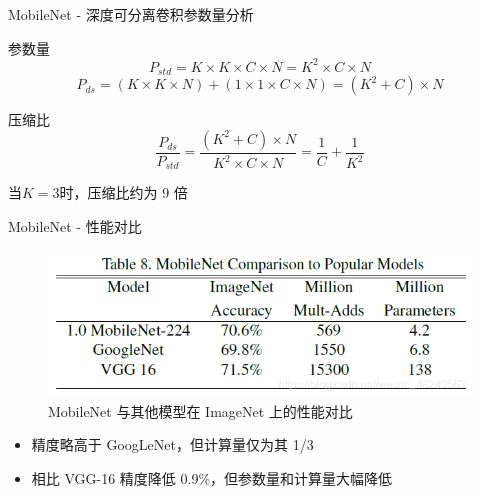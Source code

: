 \documentclass{beamer}
\begin{document}
\begin{frame}{MobileNet - 深度可分离卷积参数量分析}
    \begin{block}{参数量}
        \begin{equation*}
            P_{std} = K \times K \times C \times N = K^2 \times C \times N
        \end{equation*}
        \begin{equation*}
            P_{ds} = (K \times K \times N) + (1 \times 1 \times C \times N) = (K^2 + C) \times N
        \end{equation*}
    \end{block}
    
    \begin{block}{压缩比}
        \begin{equation*}
            \frac{P_{ds}}{P_{std}} = \frac{(K^2 + C) \times N}{K^2 \times C \times N} = \frac{1}{C} + \frac{1}{K^2}
        \end{equation*}
    \end{block}
    当$K=3$时，压缩比约为 9 倍
\end{frame}

\begin{frame}{MobileNet - 性能对比}
    \begin{figure}
        \centering
        \includegraphics[width=0.8\linewidth]{pic/mobilenet_comp.png}
        \caption{MobileNet 与其他模型在 ImageNet 上的性能对比}
    \end{figure}
    
    \begin{itemize}
        \item 精度略高于 GoogLeNet，但计算量仅为其 1/3
        \item 相比 VGG-16 精度降低 0.9\%，但参数量和计算量大幅降低
    \end{itemize}
\end{frame}

\end{document}
